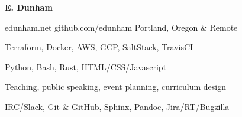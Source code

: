 \documentclass[11pt]{article} %
\begin{document}
\centerline{{\Huge \bf E. Dunham}}

\bigskip

        {edunham.net}
        {github.com/edunham}
        {Portland, Oregon \& Remote}


      {Terraform, Docker, AWS, GCP, SaltStack, TravisCI}

      {Python, Bash, Rust, HTML/CSS/Javascript}

      {Teaching, public speaking, event planning, curriculum design}

      {IRC/Slack, Git \& GitHub, Sphinx, Pandoc, Jira/RT/Bugzilla}


\end{document}
